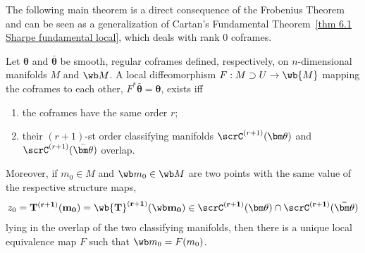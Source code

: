The following main theorem is a direct consequence of the Frobenius Theorem and can be seen as a generalization of Cartan's Fundamental Theorem~\ref{thm 6.1 Sharpe fundamental local}, which deals with rank $0$ coframes.

\begin{thm}\label{thm 8.15 Olver93}
    Let $\bm\theta$ and $\bar{\bm\theta}$ be smooth, regular coframes defined, respectively, on $n$-dimensional manifolds $M$ and $\wb M$. A local diffeomorphism $F:M\supset U\to \wb{M}$ mapping the coframes to each other, $F^\ast \bar{\bm\theta}=\bm\theta$, exists iff
    \begin{enumerate}[label=(\alph*)]
        \item the coframes have the same order $r$;
        \item their $(r+1)$-st order classifying manifolds $\scrC^{(r+1)}(\bm\theta)$ and $\scrC^{(r+1)}(\bar{\bm\theta})$ overlap.
    \end{enumerate}
    Moreover, if $m_0\in M$ and $\wb m_0\in \wb M$ are two points with the same value of the respective structure maps, 
    \[z_0=\bf{T}^{(r+1)}(m_0)=\wb{\bf{T}}^{(r+1)}(\wb m_0)\in\scrC^{(r+1)}(\bm\theta)\cap\scrC^{(r+1)}(\bar{\bm\theta})\]
    lying in the overlap of the two classifying manifolds, then there is a unique local equivalence map $F$ such that $\wb m_0=F(m_0)$.
\end{thm}
